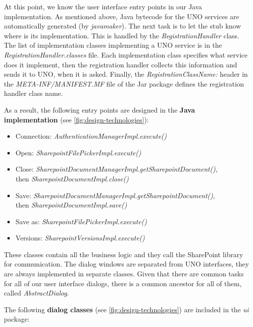
At this point, we know the user interface entry points in our Java
implementation. As mentioned above, Java bytecode for the UNO services are
automatically generated (by \emph{javamaker}). The next task is to let the stub
know where is its implementation. This is handled by the
\emph{RegistrationHandler} class. The list of implementation classes
implementing a UNO service is in the \emph{RegistrationHandler.classes} file.
Each implementation class specifies what service does it implement, then the
registration handler collects this information and sends it to UNO, when it is
asked. Finally, the \emph{RegistrationClassName:} header in the
\emph{META-INF/MANIFEST.MF} file of the Jar package defines the registration
handler class name.

As a result, the following entry points are designed in the \textbf{Java
implementation} (see \autoref{fig:design-technologies}):

\begin{itemize}
\item Connection: \emph{AuthenticationManagerImpl.execute()}
\item Open: \emph{SharepointFilePickerImpl.execute()}
\item Close: \emph{SharepointDocumentManagerImpl.getSharepointDocument()}, \\ then \emph{SharepointDocumentImpl.close()}
\item Save: \emph{SharepointDocumentManagerImpl.getSharepointDocument()}, \\ then \emph{SharepointDocumentImpl.save()}
\item Save as: \emph{SharepointFilePickerImpl.execute()}
\item Versions: \emph{SharepointVersionsImpl.execute()}
\end{itemize}

These classes contain all the business logic and they call the SharePoint
library for communication. The dialog windows are separated from UNO
interfaces, they are always implemented in separate classes. Given that there
are common tasks for all of our user interface dialogs, there is a common
ancestor for all of them, called \emph{AbstractDialog}.


The following \textbf{dialog classes} (see \autoref{fig:design-technologies}) are included in the \emph{ui} package:

